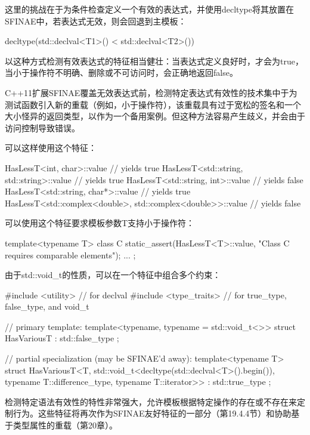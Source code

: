 这里的挑战在于为条件检查定义一个有效的表达式，并使用decltype将其放置在SFINAE中，若表达式无效，则会回退到主模板：

\begin{cpp}
decltype(std::declval<T1>() < std::declval<T2>())
\end{cpp}

以这种方式检测有效表达式的特征相当健壮：当表达式定义良好时，才会为true，当小于操作符不明确、删除或不可访问时，会正确地返回false。

\begin{notice}
C++11扩展SFINAE覆盖无效表达式前，检测特定表达式有效性的技术集中于为测试函数引入新的重载（例如，小于操作符），该重载具有过于宽松的签名和一个大小怪异的返回类型，以作为一个备用案例。但这种方法容易产生歧义，并会由于访问控制导致错误。
\end{notice}

可以这样使用这个特征：

\begin{cpp}
HasLessT<int, char>::value // yields true
HasLessT<std::string, std::string>::value // yields true
HasLessT<std::string, int>::value // yields false
HasLessT<std::string, char*>::value // yields true
HasLessT<std::complex<double>, std::complex<double>>::value // yields false
\end{cpp}

可以使用这个特征要求模板参数T支持小于操作符：

\begin{cpp}
template<typename T>
class C {
	static_assert(HasLessT<T>::value,
				  "Class C requires comparable elements");
	...
};
\end{cpp}

由于std::void\_t的性质，可以在一个特征中组合多个约束：

\begin{cpp}
#include <utility> // for declval
#include <type_traits> // for true_type, false_type, and void_t

// primary template:
template<typename, typename = std::void_t<>>
struct HasVariousT : std::false_type
{};

// partial specialization (may be SFINAE'd away):
template<typename T>
struct HasVariousT<T, std::void_t<decltype(std::declval<T>().begin()),
					typename T::difference_type,
					typename T::iterator>>
: std::true_type
{};
\end{cpp}

检测特定语法有效性的特性非常强大，允许模板根据特定操作的存在或不存在来定制行为。这些特征将再次作为SFINAE友好特征的一部分（第19.4.4节）和协助基于类型属性的重载（第20章）。


